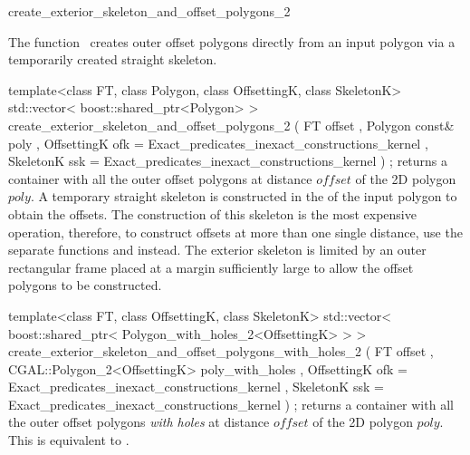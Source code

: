 

\begin{ccRefFunction}{create_exterior_skeleton_and_offset_polygons_2}


\ccDefinition

The function \ccRefName\ creates outer offset polygons directly from an input polygon via a temporarily created straight skeleton. 


\ccFunction
{template<class FT, class Polygon, class OffsettingK, class SkeletonK>
std::vector< boost::shared_ptr<Polygon> >
create_exterior_skeleton_and_offset_polygons_2
  ( FT             offset
  , Polygon const& poly
  , OffsettingK    ofk  = Exact_predicates_inexact_constructions_kernel
  , SkeletonK      ssk  = Exact_predicates_inexact_constructions_kernel
  ) ;
}
{returns a container with all the outer offset polygons at distance $offset$ of the 2D polygon $poly$.
A temporary straight skeleton is constructed in the  of the input polygon to obtain the offsets. The construction of this skeleton is the most expensive operation, therefore, to construct offsets at more than one single distance, use the separate functions  and  instead. The exterior skeleton is limited by an outer rectangular frame placed at a margin sufficiently large to allow the offset polygons to be constructed.}


\ccFunction
{template<class FT, class OffsettingK, class SkeletonK>
std::vector< boost::shared_ptr< Polygon_with_holes_2<OffsettingK> > >
create_exterior_skeleton_and_offset_polygons_with_holes_2 
  ( FT offset
  , CGAL::Polygon_2<OffsettingK> poly_with_holes
  , OffsettingK ofk = Exact_predicates_inexact_constructions_kernel
  , SkeletonK ssk   = Exact_predicates_inexact_constructions_kernel
  ) ;
}
{returns a container with all the outer offset polygons {\em with holes} at distance $offset$ of the 2D polygon $poly$.
This is equivalent to .}



\end{ccRefFunction}
